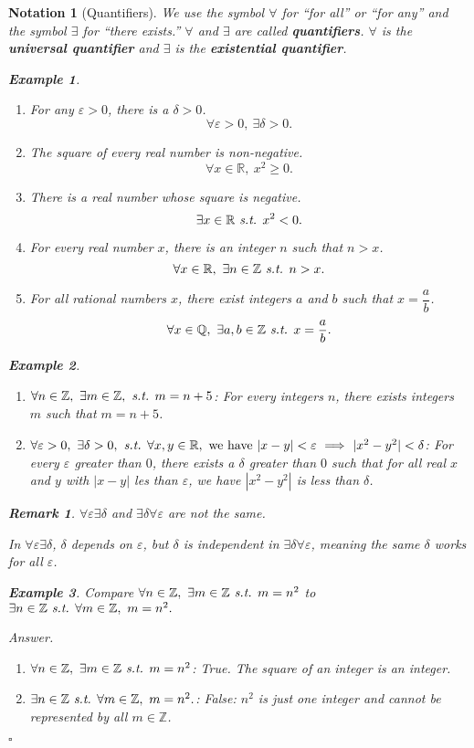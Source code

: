 \documentclass[12pt,a4paper]{article}
\newtheorem{nota}{Notation}[section]
\newtheorem{eg}{Example}[subsection]
\newenvironment*{ans}{\par{\textit{Answer. }}}{\hfill{$\square$}\par}
\newtheorem*{rmk}{\indent Remark}
\def\Z{{\mathbb{Z}}}
\def\R{{\mathbb{R}}}
\def\Q{{\mathbb{Q}}}
\def\st{\emph{ s.t. }}
\begin{document}
\begin{nota}[Quantifiers]
	We use the symbol $\forall$ for ``for all'' or ``for any'' and the symbol $\exists$ for ``there exists.'' $\forall$ and $\exists$ are called \textbf{quantifiers}. $\forall$ is the \textbf{universal quantifier} and $\exists$ is the \textbf{existential quantifier}.	 
	\begin{eg}
		\begin{enumerate}
			\item For any $\varepsilon>0$, there is a $\delta>0$.\[\forall\varepsilon>0,\ \exists\delta>0.\]
			\item The square of every real number is non-negative. \[\forall x\in\R,\ x^2\geq0.\]
			\item There is a real number whose square is negative. \[\exists x\in\R\st x^2<0.\]
			\item For every real number $x$, there is an integer $n$ such that $n>x$. \[\forall x\in\R,\ \exists n\in\Z\st n>x.\]
			\item For all rational numbers $x$, there exist integers $a$ and $b$ such that $x=\dfrac{a}{b}$. \[\forall x\in\Q,\ \exists a,b\in\Z\st x=\frac{a}{b}.\]
		\end{enumerate}	
	\end{eg}
	\begin{eg}
		\begin{enumerate}
			\item $\forall n\in\Z,\ \exists m\in\Z,\st m=n+5$: For every integers $n$, there exists integers $m$ such that $m=n+5$.
			\item $\forall\varepsilon>0,\ \exists\delta>0,\st\forall x,y\in\R,\text{ we have }|x-y|<\varepsilon\ \Longrightarrow\ |x^2-y^2|<\delta$: For every $\varepsilon$ greater than $0$, there exists a $\delta$ greater than $0$ such that for all real $x$ and $y$ with $|x-y|$ les than $\varepsilon$, we have $|x^2-y^2|$ is less than $\delta$. 
		\end{enumerate}
	\end{eg}
	\begin{rmk}
		$\forall\varepsilon\exists\delta$ and $\exists\delta\forall\varepsilon$ are not the same.
		
		In $\forall\varepsilon\exists\delta$, $\delta$ depends on $\varepsilon$, but $\delta$ is independent in $\exists\delta\forall\varepsilon$, meaning the same $\delta$ works for all $\varepsilon$.
		\begin{eg} 
			Compare $\forall n\in\Z,\ \exists m\in\Z\st m=n^2$ to  $\exists n\in\Z\st\forall m\in\Z,\ m=n^2.$
			\begin{ans}
				\begin{enumerate}
					\item $\forall n\in\Z,\ \exists m\in\Z\st m=n^2$: True. The square of an integer is an integer. 
					\item $\exists n\in\Z\st\forall m\in\Z,\ m=n^2.$: False: $n^2$ is just one integer and cannot be represented by all $m\in\Z$.
				\end{enumerate}
			\end{ans}
		\end{eg}
	\end{rmk}
\end{nota}
\end{document}
